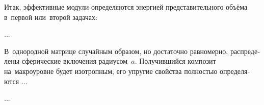

\label{para:composites.eshelbyformulas}

\begin{otherlanguage}{russian}

Итак, эффективные модули определяются энергией представительного объёма в~первой или~второй задачах:

...



\end{otherlanguage}



\label{para:composites.materialwithsphericalinclusions}

\begin{otherlanguage}{russian}

В~однородной матрице случайным образом, но достаточно равномерно, распределены сферические включения радиусом~$a$. Получившийся композит на~макроуровне будет изотропным, его упругие свойства полностью определяются ...

...



\end{otherlanguage}



